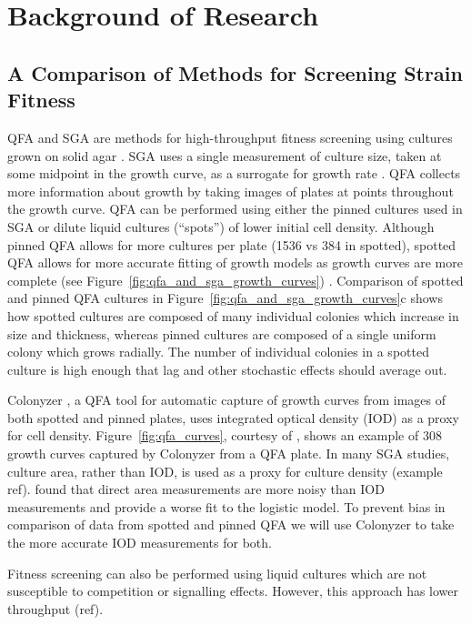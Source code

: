 \graphicspath{{images_low_res/}}

\section{Background of Research}
\label{sec:background}

\subsection{A Comparison of Methods for Screening Strain Fitness }

QFA and SGA are methods for high-throughput fitness screening using cultures grown on
solid agar \citep{Baryshnikova2010sga,Banks2012}. SGA uses a single measurement of culture
size, taken at some midpoint in the growth curve, as a surrogate for growth rate
\citep{Baryshnikova2010sga}. QFA collects more information about growth by taking images
of plates at points throughout the growth curve. QFA can be performed using either the
pinned cultures used in SGA or dilute liquid cultures (``spots'') of lower initial cell
density. Although pinned QFA allows for more cultures per plate (1536 vs 384 in spotted),
spotted QFA allows for more accurate fitting of growth models as growth curves are more
complete (see Figure~\ref{fig:qfa_and_sga_growth_curves}) \citep{Lawless2010}. Comparison
of spotted and pinned QFA cultures in Figure~\ref{fig:qfa_and_sga_growth_curves}c shows
how spotted cultures are composed of many individual colonies which increase in size and
thickness, whereas pinned cultures are composed of a single uniform colony which grows
radially. The number of individual colonies in a spotted culture is high enough that lag
and other stochastic effects should average out.

Colonyzer \citep{Lawless2010}, a QFA tool for automatic capture of growth curves from
images of both spotted and pinned plates, uses integrated optical density (IOD) as a proxy
for cell density. Figure~\ref{fig:qfa_curves}, courtesy of \citet{Banks2012}, shows an
example of 308 growth curves captured by Colonyzer from a QFA plate. In many SGA studies,
culture area, rather than IOD, is used as a proxy for culture density (example
ref). \cite{Lawless2010} found that direct area measurements are more noisy than IOD
measurements and provide a worse fit to the logistic model. To prevent bias in comparison
of data from spotted and pinned QFA we will use Colonyzer to take the more accurate IOD
measurements for both.

Fitness screening can also be performed using liquid cultures which are not susceptible to
competition or signalling effects. However, this approach has lower throughput (ref).

